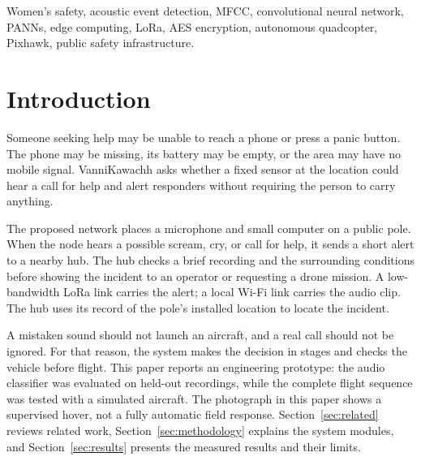 \documentclass[conference]{IEEEtran}
\begin{document}
\begin{IEEEkeywords}
Women's safety, acoustic event detection, MFCC, convolutional neural network,
PANNs, edge computing, LoRa, AES encryption, autonomous quadcopter, Pixhawk,
public safety infrastructure.
\end{IEEEkeywords}

\section{Introduction}
\label{sec:introduction}
Someone seeking help may be unable to reach a phone or press a panic button. The phone may be missing, its battery may be empty, or the area may have no mobile signal. VanniKawachh asks whether a fixed sensor at the location could hear a call for help and alert responders without requiring the person to carry anything.

The proposed network places a microphone and small computer on a public pole. When the node hears a possible scream, cry, or call for help, it sends a short alert to a nearby hub. The hub checks a brief recording and the surrounding conditions before showing the incident to an operator or requesting a drone mission. A low-bandwidth LoRa link carries the alert; a local Wi-Fi link carries the audio clip. The hub uses its record of the pole's installed location to locate the incident.

A mistaken sound should not launch an aircraft, and a real call should not be ignored. For that reason, the system makes the decision in stages and checks the vehicle before flight. This paper reports an engineering prototype: the audio classifier was evaluated on held-out recordings, while the complete flight sequence was tested with a simulated aircraft. The photograph in this paper shows a supervised hover, not a fully automatic field response. Section~\ref{sec:related} reviews related work, Section~\ref{sec:methodology} explains the system modules, and Section~\ref{sec:results} presents the measured results and their limits.
\end{document}
